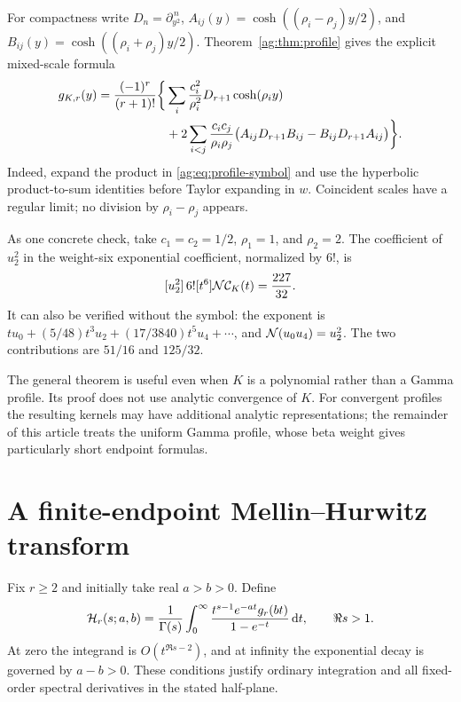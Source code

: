 \documentclass[11pt,letterpaper]{article}
\numberwithin{equation}{section}
\theoremstyle{definition}\newtheorem{definition}[theorem]{Definition}
\theoremstyle{remark}\newtheorem{remark}[theorem]{Remark}
\newcommand{\dd}{\,\mathrm d}\newcommand{\ii}{\mathrm i}
\begin{document}
For compactness write
$D_n=\partial_{y^2}^{\,n}$,
$A_{ij}(y)=\cosh((\rho_i-\rho_j)y/2)$, and
$B_{ij}(y)=\cosh((\rho_i+\rho_j)y/2)$.
Theorem~\ref{ag:thm:profile} gives the explicit mixed-scale formula
\begin{align}
 g_{K,r}(y)
 =\frac{(-1)^r}{(r+1)!}\bigg\{&
 \sum_i\frac{c_i^2}{\rho_i^2}D_{r+1}\cosh(\rho_i y)\notag\\
 &+2\sum_{i<j}\frac{c_ic_j}{\rho_i\rho_j}
 \bigl(A_{ij}D_{r+1}B_{ij}-B_{ij}D_{r+1}A_{ij}\bigr)\bigg\}.
 \label{ag:eq:mixed-square}
\end{align}
Indeed, expand the product in \eqref{ag:eq:profile-symbol} and use the
hyperbolic product-to-sum identities before Taylor expanding in $w$.
Coincident scales have a regular limit; no division by
$\rho_i-\rho_j$ appears.

As one concrete check, take $c_1=c_2=1/2$, $\rho_1=1$, and $\rho_2=2$.
The coefficient of $u_2^2$ in the weight-six exponential coefficient,
normalized by $6!$, is
\begin{equation}\label{ag:eq:mixed-example}
 [u_2^2]\,6![t^6]\mathcal N\mathcal C_K(t)=\frac{227}{32}.
\end{equation}
It can also be verified without the symbol: the exponent is
$tu_0+(5/48)t^3u_2+(17/3840)t^5u_4+\cdots$, and
$\mathcal N(u_0u_4)=u_2^2$. The two contributions are $51/16$ and $125/32$.

The general theorem is useful even when $K$ is a polynomial rather
than a Gamma profile. Its proof does not use analytic convergence of
$K$. For convergent profiles the resulting kernels may have additional
analytic representations; the remainder of this article treats the
uniform Gamma profile, whose beta weight gives particularly short
endpoint formulas.



\section{A finite-endpoint Mellin--Hurwitz transform}
\label{ag:sec:hurwitz}

Fix $r\ge2$ and initially take real $a>b>0$. Define
\begin{equation}\label{ag:eq:Hmellin}
 \HH_r(s;a,b)=\frac1{\Gamma(s)}\int_0^\infty
       \frac{t^{s-1}e^{-at}g_r(bt)}{1-e^{-t}}\dd t,
                  \qquad \Re s>1.
\end{equation}
At zero the integrand is $O(t^{\Re s-2})$, and at infinity the
exponential decay is governed by $a-b>0$. These conditions justify
ordinary integration and all fixed-order spectral derivatives in the
stated half-plane.
\end{document}
